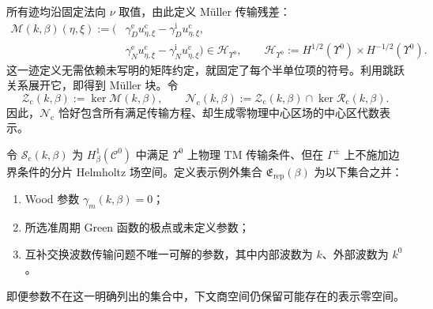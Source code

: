所有迹均沿固定法向 $\nu$ 取值，由此定义 M\"uller 传输残差：
\begin{equation}
\begin{split}
  \mathcal M(k,\beta)(\eta,\xi):=
  \bigl(&\gamma_D^{\mathrm e}u_{\eta,\xi}^{\mathrm c}
         -\gamma_D^{\mathrm i}u_{\eta,\xi}^{\mathrm c},\\
        &\gamma_N^{\mathrm e}u_{\eta,\xi}^{\mathrm c}
         -\gamma_N^{\mathrm i}u_{\eta,\xi}^{\mathrm c}\bigr)
  \in\mathcal H_{\Upsilon^0},
  \qquad
  \mathcal H_{\Upsilon^0}:=H^{1/2}(\Upsilon^0)\times H^{-1/2}(\Upsilon^0).
\end{split}
\label{eq:Muller-residual}
\end{equation}
这一迹定义无需依赖未写明的矩阵约定，就固定了每个半单位项的符号。利用跳跃关系展开它，即得到 M\"uller 块。令
\begin{equation}
  \mathcal Z_{\mathrm c}(k,\beta):=\ker\mathcal M(k,\beta),
  \qquad
  \mathcal N_{\mathrm c}(k,\beta):=
  \mathcal Z_{\mathrm c}(k,\beta)\cap\ker\mathcal R_{\mathrm c}(k,\beta).
  \label{eq:center-nullspaces}
\end{equation}
因此，$\mathcal N_{\mathrm c}$ 恰好包含所有满足传输方程、却生成零物理中心区场的中心区代数表示。

令 $\mathcal S_{\mathrm c}(k,\beta)$ 为 $H^1_\beta(\mathcal C^0)$ 中满足 $\Upsilon^0$ 上物理 TM 传输条件、但在 $\Gamma^\pm$ 上不施加边界条件的分片 Helmholtz 场空间。定义表示例外集合 $\mathfrak E_{\mathrm{rep}}(\beta)$ 为以下集合之并：
\begin{enumerate}[label=(\roman*),leftmargin=2.2em]
  \item Wood 参数 $\gamma_m(k,\beta)=0$；
  \item 所选准周期 Green 函数的极点或未定义参数；
  \item 互补交换波数传输问题不唯一可解的参数，其中内部波数为 $k$、外部波数为 $k^0$。
\end{enumerate}
即便参数不在这一明确列出的集合中，下文商空间仍保留可能存在的表示零空间。

